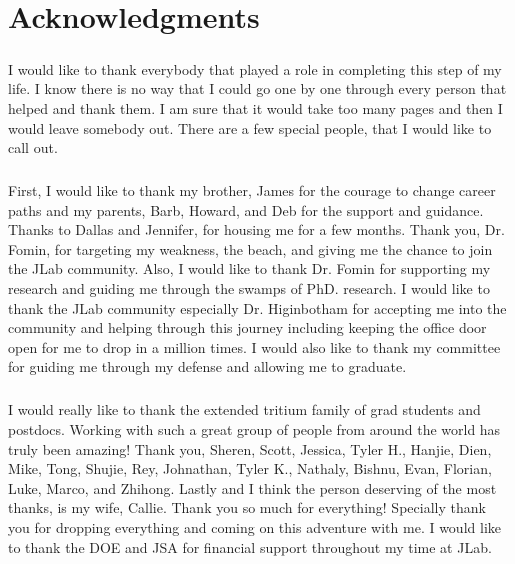 \chapter*{Acknowledgments}

\paragraph{}I would like to thank everybody that played a role in completing this step of my life. I know there is no way that I could go one by one through every person that helped and thank them. I am sure that it would take too many pages and then I would leave somebody out. There are a few special people, that I would like to call out. 
\paragraph{}First, I would like to thank my brother, James for the courage to change career paths and my parents, Barb, Howard, and Deb for the support and guidance. Thanks to Dallas and Jennifer, for housing me for a few months. Thank you, Dr. Fomin, for targeting my weakness, the beach, and giving me the chance to join the JLab community. Also, I would like to thank Dr. Fomin for supporting my research and guiding me through the swamps of PhD. research. I would like to thank the JLab community especially Dr. Higinbotham for accepting me into the community and helping through this journey including keeping the office door open for me to drop in a million times. I would also like to thank my committee for guiding me through my defense and allowing me to graduate. 
\paragraph{}I would really like to thank the extended tritium family of grad students and postdocs. Working with such a great group of people from around the world has truly been amazing! Thank you, Sheren, Scott, Jessica, Tyler H., Hanjie, Dien, Mike, Tong, Shujie, Rey, Johnathan, Tyler K., Nathaly, Bishnu, Evan, Florian, Luke, Marco, and Zhihong. Lastly and I think the person deserving of the most thanks, is my wife, Callie. Thank you so much for everything! Specially thank you for dropping everything and coming on this adventure with me.
I would like to thank the DOE and JSA for financial support throughout my time at JLab. 